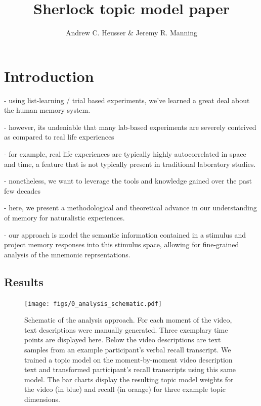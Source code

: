 \documentclass[a4paper,man,natbib,floatsintext]{apa6}
\title{Sherlock topic model paper}
\author{Andrew C. Heusser \& Jeremy R. Manning}
\affiliation{Dartmouth College}
\begin{document}
\maketitle

\section{Introduction}

- using list-learning / trial based experiments, we've learned a great deal about the human memory system.

- however, its undeniable that many lab-based experiments are severely contrived as compared to real life experiences

- for example, real life experiences are typically highly autocorrelated in space and time, a feature that is not typically present in traditional laboratory studies.

- nonetheless, we want to leverage the tools and knowledge gained over the past few decades

- here, we present a methodological and theoretical advance in our understanding of memory for naturalistic experiences.

- our approach is model the semantic information contained in a stimulus and project memory responses into this stimulus space, allowing for fine-grained analysis of the mnemonic reprsentations.

\subsection{Results}

\begin{figure}[t!]
\centering
\texttt{[image: figs/0\_analysis\_schematic.pdf]}
\caption{\label{fig:schematic}Schematic of the analysis approach. For each moment of the video, text descriptions were manually generated. Three exemplary time points are displayed here.  Below the video descriptions are text samples from an example participant's verbal recall transcript.  We trained a topic model on the moment-by-moment video description text and transformed participant's recall transcripts using this same model. The bar charts display the resulting topic model weights for the video (in blue) and recall (in orange) for three example topic dimensions.}
\end{figure}
\end{document}
